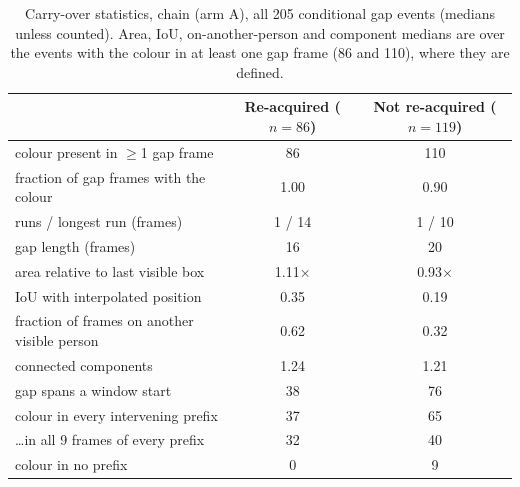 \documentclass{article} %
\newcommand{\rev}[1]{{\color{blue}#1}}
\begin{document}
\begin{table}[h]
\caption{\rev{Carry-over statistics, chain (arm A), all 205 conditional gap events
(medians unless counted). Area, IoU, on-another-person and component medians are over the
events with the colour in at least one gap frame (86 and 110), where they are defined.}}
\label{tab:mech}
\begin{center}
\scriptsize
\begin{tabular}{lcc}
\toprule
 & \rev{Re-acquired ($n{=}86$)} & \rev{Not re-acquired ($n{=}119$)} \\
\midrule
\rev{colour present in $\geq$1 gap frame} & \rev{86} & \rev{110} \\
\rev{fraction of gap frames with the colour} & \rev{1.00} & \rev{0.90} \\
\rev{runs / longest run (frames)} & \rev{1 / 14} & \rev{1 / 10} \\
\rev{gap length (frames)} & \rev{16} & \rev{20} \\
\rev{area relative to last visible box} & \rev{1.11$\times$} & \rev{0.93$\times$} \\
\rev{IoU with interpolated position} & \rev{0.35} & \rev{0.19} \\
\rev{fraction of frames on another visible person} & \rev{0.62} & \rev{0.32} \\
\rev{connected components} & \rev{1.24} & \rev{1.21} \\
\rev{gap spans a window start} & \rev{38} & \rev{76} \\
\rev{\quad colour in every intervening prefix} & \rev{37} & \rev{65} \\
\rev{\quad \ldots in all 9 frames of every prefix} & \rev{32} & \rev{40} \\
\rev{\quad colour in no prefix} & \rev{0} & \rev{9} \\
\bottomrule
\end{tabular}
\end{center}
\end{table}
\end{document}
